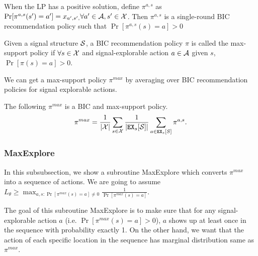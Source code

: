 \begin{claim}
When the LP has a positive solution, define $\pi^{a,s}$ as $\Pr[\pi^{a,s}(s') = a'] = x_{a',s', } \forall a' \in \A, s' \in \X$. Then $\pi^{a,s}$ is a single-round BIC recommendation policy such that $\Pr[\pi^{a,s}(s) = a] > 0$
\end{claim}

\begin{definition}
Given a signal structure $\S$, a BIC recommendation policy $\pi$ is called the max-support policy if $\forall s \in \X$  and signal-explorable action $a\in \A$ given $s$, $\Pr[\pi(s) = a] > 0$.
\end{definition}


We can get a max-support policy $\pi^{max}$ by averaging over BIC recommendation policies for signal explorable actions.
\begin{claim}
\label{clm:pimax}
The following $\pi^{max}$ is a BIC and max-support policy. 
\[
\pi^{max} = \frac{1}{|\X|} \sum_{s \in \X} \frac{1}{|\EX_s[\S]|} \sum_{a \in \EX_s[S]} \pi^{a,s}.
\]
\end{claim}

\subsubsection{MaxExplore}
\label{sec:public_maxe}

In this subsubsection, we show a subroutine MaxExplore which converts $\pi^{max}$ into a sequence of actions. We are going to assume $L_{\theta} \geq \max_{a,s: \Pr[\pi^{max}(s)=a] \neq 0} \frac{1}{\Pr[\pi^{max}(s)=a]}$.

The goal of this subroutine MaxExplore is to make sure that for any signal-explorable action $a$ (i.e. $\Pr[\pi^{max}(s) = a] > 0$), $a$ shows up at least once in the sequence with probability exactly 1. On the other hand, we want that the action of each specific location in the sequence has marginal distribution same as $\pi^{max}$. 

